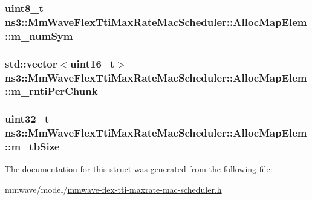 \subsubsection[{\texorpdfstring{m\+\_\+num\+Sym}{m_numSym}}]{\setlength{\rightskip}{0pt plus 5cm}uint8\+\_\+t ns3\+::\+Mm\+Wave\+Flex\+Tti\+Max\+Rate\+Mac\+Scheduler\+::\+Alloc\+Map\+Elem\+::m\+\_\+num\+Sym}\hypertarget{structns3_1_1MmWaveFlexTtiMaxRateMacScheduler_1_1AllocMapElem_a659c5bd4b7fb615313f4b9c97879e868}{}\label{structns3_1_1MmWaveFlexTtiMaxRateMacScheduler_1_1AllocMapElem_a659c5bd4b7fb615313f4b9c97879e868}
\subsubsection[{\texorpdfstring{m\+\_\+rnti\+Per\+Chunk}{m_rntiPerChunk}}]{\setlength{\rightskip}{0pt plus 5cm}std\+::vector$<$uint16\+\_\+t$>$ ns3\+::\+Mm\+Wave\+Flex\+Tti\+Max\+Rate\+Mac\+Scheduler\+::\+Alloc\+Map\+Elem\+::m\+\_\+rnti\+Per\+Chunk}\hypertarget{structns3_1_1MmWaveFlexTtiMaxRateMacScheduler_1_1AllocMapElem_a83d0a705ba98540bcf9293fbb42ffed1}{}\label{structns3_1_1MmWaveFlexTtiMaxRateMacScheduler_1_1AllocMapElem_a83d0a705ba98540bcf9293fbb42ffed1}
\subsubsection[{\texorpdfstring{m\+\_\+tb\+Size}{m_tbSize}}]{\setlength{\rightskip}{0pt plus 5cm}uint32\+\_\+t ns3\+::\+Mm\+Wave\+Flex\+Tti\+Max\+Rate\+Mac\+Scheduler\+::\+Alloc\+Map\+Elem\+::m\+\_\+tb\+Size}\hypertarget{structns3_1_1MmWaveFlexTtiMaxRateMacScheduler_1_1AllocMapElem_a1fc02ffdf7cd5577c5221f4797d75f8c}{}\label{structns3_1_1MmWaveFlexTtiMaxRateMacScheduler_1_1AllocMapElem_a1fc02ffdf7cd5577c5221f4797d75f8c}


The documentation for this struct was generated from the following file\+:\begin{DoxyCompactItemize}
\item 
mmwave/model/\hyperlink{mmwave-flex-tti-maxrate-mac-scheduler_8h}{mmwave-\/flex-\/tti-\/maxrate-\/mac-\/scheduler.\+h}\end{DoxyCompactItemize}

